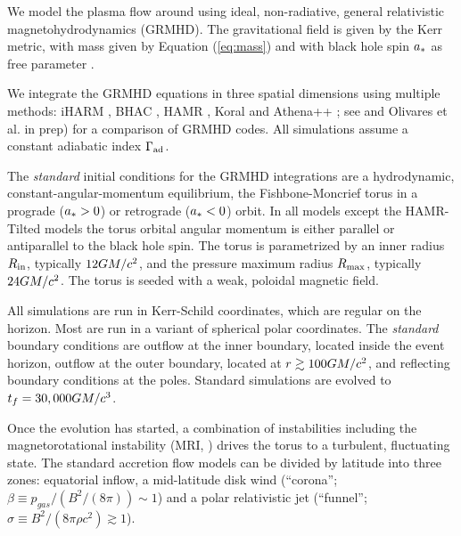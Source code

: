 We model the plasma flow around \sgra using ideal, non-radiative, general relativistic magnetohydrodynamics (GRMHD).  The gravitational field is given by the Kerr metric, with mass given by Equation (\ref{eq:mass}) and with black hole spin $a_*$ as free parameter \citep[see e.g.,][]{2003ApJ...589..444G, 2005ApJ...635..723A, 2007A&A...473...11D}.

We integrate the GRMHD equations in three spatial dimensions using multiple methods: iHARM \citep{2021JOSS....6.3336P}, BHAC \citep{2017ComAC...4....1P}, HAMR \citep{2018MNRAS.474L..81L}, Koral \citep{2013MNRAS.429.3533S} and Athena++ \citep{2016ApJS..225...22W}; see \citealt{2019ApJS..243...26P} and Olivares et al. in prep) for a comparison of GRMHD codes.  All simulations assume a constant adiabatic index $\Gamma_{\rm ad}$.

The {\em standard} initial conditions for the GRMHD integrations are a hydrodynamic, constant-angular-momentum equilibrium, the Fishbone-Moncrief torus \citep{1976ApJ...207..962F} in a prograde ($a_* > 0$) or retrograde ($a_* < 0$) orbit.  In all models except the HAMR-Tilted models the torus orbital angular momentum is either parallel or antiparallel to the black hole spin. The torus is parametrized by an inner radius $R_{\rm in}$, typically $12GM/c^2$, and the pressure maximum radius $R_{\rm max}$, typically $24GM/c^2$.
The torus is seeded with a weak, poloidal magnetic field.

All simulations are run in Kerr-Schild coordinates, which are regular on the horizon.  Most are run in a variant of spherical polar coordinates.  The {\em standard} boundary conditions are outflow at the inner boundary, located inside the event horizon, outflow at the outer boundary, located at $r \gtrsim 100 GM/c^2$, and reflecting boundary conditions at the poles.  Standard  simulations are evolved to $t_f=30,000 GM/c^3$.

Once the evolution has started, a combination of instabilities including the magnetorotational instability (MRI, \citealt{1992ApJ...400..610B}) drives the torus to a turbulent, fluctuating state. The standard accretion flow models can be divided by  latitude into three zones: equatorial inflow, a mid-latitude disk wind (``corona''; $\beta \equiv p_{gas}/(B^2/(8\pi)) \sim 1$) and a polar relativistic jet (``funnel''; $\sigma \equiv B^2/(8\pi \rho c^2) \gtrsim 1$).

